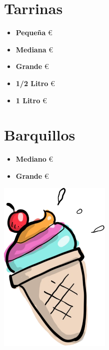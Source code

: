 \documentclass[a4paper,12pt]{article}
\begin{document}
\begin{multicols}{2}
\section*{Tarrinas}
\begin{itemize}
    \item \textbf{Pequeña}  €
    \item \textbf{Mediana}  €
    \item \textbf{Grande}  €
    \item \textbf{1/2 Litro}  €
    \item \textbf{1 Litro}  €
\end{itemize}

\section*{Barquillos}
\begin{itemize}
    \item \textbf{Mediano}  €
    \item \textbf{Grande}  €
\end{itemize}

\columnbreak

\includegraphics[width=0.4\textwidth]{../../images/ConoHeladoNoBG.png}
\end{multicols}

\vfill
\end{document}
